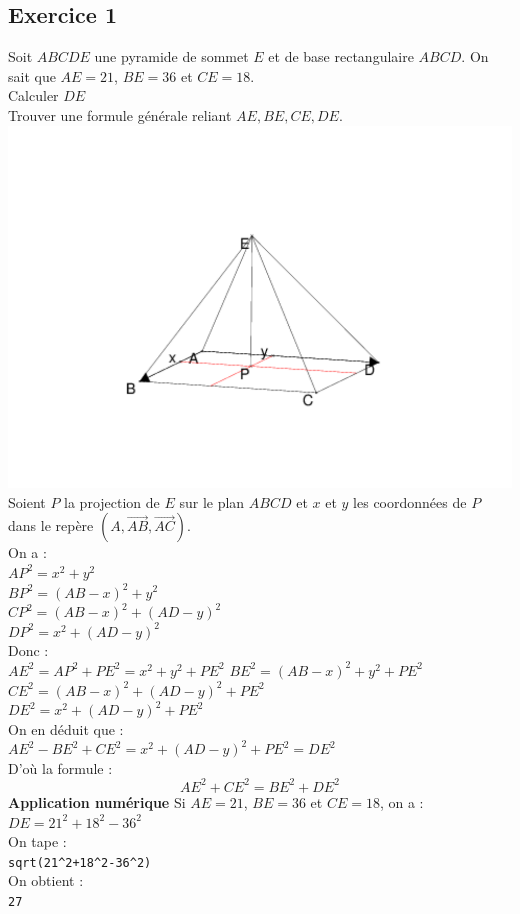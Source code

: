 \documentclass[a4paper,11pt]{book}
\begin{document}
\subsection{Exercice 1}
Soit $ABCDE$ une pyramide de sommet $E$ et de base rectangulaire $ABCD$.
On sait que $AE=21$, $BE=36$ et $CE=18$.\\
Calculer  $DE$ \\
Trouver une formule g\'en\'erale reliant $AE,BE,CE,DE$.\\
\includegraphics[width=\textwidth]{pyramide}\\

Soient $P$ la projection de $E$ sur le plan $ABCD$ et $x$ et $y$ les coordonn\'ees de $P$ dans le rep\`ere $(A,\overrightarrow{AB},\overrightarrow{AC})$.\\
On a :\\
$AP^2=x^2+y^2$\\
$BP^2=(AB-x)^2+y^2$\\
$CP^2=(AB-x)^2+(AD-y)^2$\\
$DP^2=x^2+(AD-y)^2$\\
Donc :\\
$AE^2=AP^2+PE^2=x^2+y^2+PE^2$
$BE^2=(AB-x)^2+y^2+PE^2$\\
$CE^2=(AB-x)^2+(AD-y)^2+PE^2$\\
$DE^2=x^2+(AD-y)^2+PE^2$\\
On en d\'eduit que :\\
$AE^2-BE^2+CE^2=x^2+(AD-y)^2+PE^2=DE^2$\\
D'o\`u la formule :
$$AE^2+CE^2=BE^2+DE^2$$
{\bf Application num\'erique}
Si $AE=21$, $BE=36$ et $CE=18$, on a :\\
$DE=21^2+18^2-36^2$\\
On tape :\\
{\tt sqrt(21\verb|^|2+18\verb|^|2-36\verb|^|2)}\\
On obtient :\\
{\tt 27}
\end{document}
